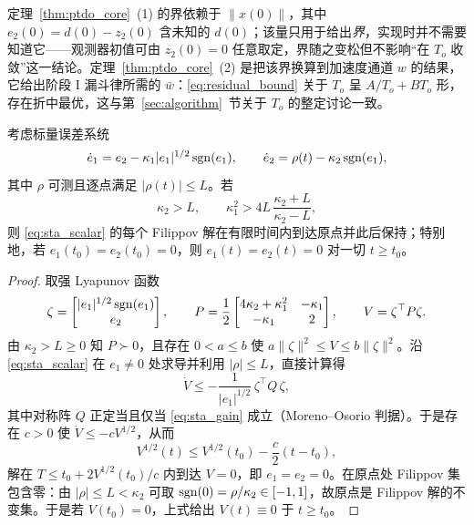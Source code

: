\begin{remark}[交接点与残差的含义]\label{rem:handover_obs}
定理~\ref{thm:ptdo_core}~(1) 的界依赖于 \(\|x(0)\|\)，其中 \(e_2(0)=d(0)-z_2(0)\) 含未知的 \(d(0)\)；该量只用于给出\emph{界}，实现时并不需要知道它——观测器初值可由 \(z_2(0)=0\) 任意取定，界随之变松但不影响“在 \(T_o\) 收敛”这一结论。定理~\ref{thm:ptdo_core}~(2) 是把该界换算到加速度通道 \(w\) 的结果，它给出阶段 I 漏斗律所需的 \(\bar w\)：\eqref{eq:residual_bound} 关于 \(T_o\) 呈 \(A/T_o+BT_o\) 形，存在折中最优，这与第~\ref{sec:algorithm}~节关于 \(T_o\) 的整定讨论一致。
\end{remark}

\begin{lemma}[超螺旋有限时间收敛]\label{lem:sta}
考虑标量误差系统
\begin{equation}
\dot e_1=e_2-\kappa_1\lvert e_1\rvert^{1/2}\operatorname{sgn}(e_1),\qquad
\dot e_2=\rho(t)-\kappa_2\operatorname{sgn}(e_1),
\label{eq:sta_scalar}
\end{equation}
其中 \(\rho\) 可测且逐点满足 \(\lvert\rho(t)\rvert\le L\)。若
\begin{equation}
\kappa_2>L,\qquad \kappa_1^{2}>4L\,\frac{\kappa_2+L}{\kappa_2-L},
\label{eq:sta_gain}
\end{equation}
则 \eqref{eq:sta_scalar} 的每个 Filippov 解在有限时间内到达原点并此后保持；特别地，若 \(e_1(t_0)=e_2(t_0)=0\)，则 \(e_1(t)=e_2(t)=0\) 对一切 \(t\ge t_0\)。
\end{lemma}

\begin{proof}
取强 Lyapunov 函数\cite{moreno2012strict}
\[
\zeta=\begin{bmatrix}\lvert e_1\rvert^{1/2}\operatorname{sgn}(e_1)\\ e_2\end{bmatrix},\qquad
P=\frac12\begin{bmatrix}4\kappa_2+\kappa_1^{2}&-\kappa_1\\-\kappa_1&2\end{bmatrix},\qquad
V=\zeta^{\top}P\zeta .
\]
由 \(\kappa_2>L\ge0\) 知 \(P\succ0\)，且存在 \(0<a\le b\) 使 \(a\lVert\zeta\rVert^{2}\le V\le b\lVert\zeta\rVert^{2}\)。沿 \eqref{eq:sta_scalar} 在 \(e_1\ne0\) 处求导并利用 \(\lvert\rho\rvert\le L\)，直接计算得
\[
\dot V\le-\frac{1}{\lvert e_1\rvert^{1/2}}\,\zeta^{\top}Q\,\zeta ,
\]
其中对称阵 \(Q\) 正定当且仅当 \eqref{eq:sta_gain} 成立（Moreno--Osorio 判据）。于是存在 \(c>0\) 使 \(\dot V\le-cV^{1/2}\)，从而
\[
V^{1/2}(t)\le V^{1/2}(t_0)-\frac{c}{2}(t-t_0),
\]
解在 \(T\le t_0+2V^{1/2}(t_0)/c\) 内到达 \(V=0\)，即 \(e_1=e_2=0\)。在原点处 Filippov 集包含零：由 \(\lvert\rho\rvert\le L<\kappa_2\) 可取 \(\operatorname{sgn}(0)=\rho/\kappa_2\in[-1,1]\)，故原点是 Filippov 解的不变集。于是若 \(V(t_0)=0\)，上式给出 \(V(t)\equiv0\) 于 \(t\ge t_0\)。
\end{proof}

